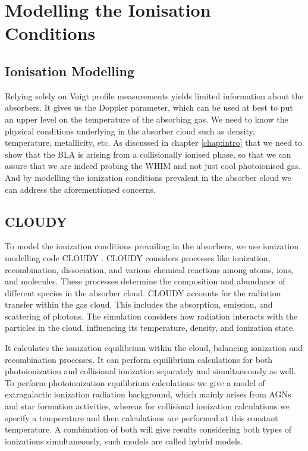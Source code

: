 \chapter{Modelling the Ionisation Conditions}  \label{chap:Ion-Model}

\section{Ionisation  Modelling}

Relying solely on Voigt profile measurements yields limited information about the absorbers. It gives us the Doppler parameter, which can be used at best to put an upper level on the temperature of the absorbing gas. We need to know the physical conditions underlying in the absorber cloud such as density, temperature, metallicity, etc. As discussed in chapter \ref{chap:intro} that we need to show that the BLA is arising from a collisionally ionised phase, so that we can assure that we are indeed probing the WHIM and not just cool photoionised gas. And by modelling the ionization conditions prevalent in the absorber cloud we can address the aforementioned concerns.

\section{CLOUDY} \label{sec:Cloudy}

To model the ionization conditions prevailing in the absorbers, we use ionization modelling code CLOUDY \citep{cloudy}. CLOUDY considers processes like ionization, recombination, dissociation, and various chemical reactions among atoms, ions, and molecules. These processes determine the composition and abundance of different species in the absorber cloud. CLOUDY accounts for the radiation transfer within the gas cloud. This includes the absorption, emission, and scattering of photons. The simulation considers how radiation interacts with the particles in the cloud, influencing its temperature, density, and ionization state. 

It calculates the ionization equilibrium within the cloud, balancing ionization and recombination processes. It can perform equilibrium calculations for both photoionization and collisional ionization separately and simultaneously as well. To perform photoionization equilibrium calculations we give a model of extragalactic ionization radiation background, which mainly arises from AGNs and star formation activities, whereas for collisional ionization calculations we specify a temperature and then calculations are performed at this constant temperature. A combination of both will give results considering both types of ionizations simultaneously, such models are called hybrid models. 

